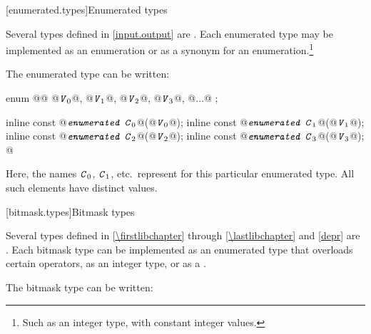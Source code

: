 [enumerated.types]{Enumerated types}

\pnum
Several types defined in \ref{input.output} are
.
Each enumerated type may be implemented as an enumeration or as a synonym for
an enumeration.\footnote{Such as an integer type, with constant integer
values.}

\pnum
The enumerated type  can be written:

\begin{codeblock}
enum @@ { @$\texttt{\textit{V}}_{0}$@, @$\texttt{\textit{V}}_{1}$@, @$\texttt{\textit{V}}_{2}$@, @$\texttt{\textit{V}}_{3}$@, @$\ldots$@ };

inline const @$\texttt{\textit{enumerated C}}_{0}$@(@$\texttt{\textit{V}}_{0}$@);
inline const @$\texttt{\textit{enumerated C}}_{1}$@(@$\texttt{\textit{V}}_{1}$@);
inline const @$\texttt{\textit{enumerated C}}_{2}$@(@$\texttt{\textit{V}}_{2}$@);
inline const @$\texttt{\textit{enumerated C}}_{3}$@(@$\texttt{\textit{V}}_{3}$@);
  @\vdots@
\end{codeblock}

\pnum
Here, the names $\texttt{\textit{C}}_0$,
$\texttt{\textit{C}}_1$, etc.\ represent
for this particular enumerated type.
%
All such elements have distinct values.

[bitmask.types]{Bitmask types}

\pnum
Several types defined in \ref{\firstlibchapter} through \ref{\lastlibchapter}
and \ref{depr} are
.
Each bitmask type can be implemented as an
enumerated type that overloads certain operators, as an integer type,
or as a
.
%

\pnum
The bitmask type  can be written:

